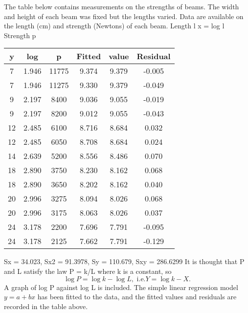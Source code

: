 \documentclass[a4paper,12pt]{article}
\begin{document}
\noindent The table below contains measurements on the strengths of beams. The width
and height of each beam was fixed but the lengths varied. Data are available
on the length (cm) and strength (Newtons) of each beam.
Length l x = log l Strength
p

\begin{center}
\begin{tabular}{c|c|c|c|c|c|}
y    &  log  &  p  &  Fitted  &  value  &  Residual\\ \hline
7  &  1.946  &  11775  &  9.374  &  9.379  &  -0.005\\ \hline
7  &  1.946  &  11275  &  9.330  &  9.379  &  -0.049\\ \hline
9  &  2.197  &  8400  &  9.036  &  9.055  &  -0.019 \\ \hline
9  &  2.197  &  8200  &  9.012  &  9.055  &  -0.043 \\ \hline
12  &  2.485  &  6100  &  8.716  &  8.684  &  0.032 \\ \hline
12  &  2.485  &  6050  &  8.708  &  8.684  &  0.024 \\ \hline
14  &  2.639  &  5200  &  8.556  &  8.486  &  0.070 \\ \hline
18  &  2.890  &  3750  &  8.230  &  8.162  &  0.068 \\ \hline
18  &  2.890  &  3650  &  8.202  &  8.162  &  0.040 \\ \hline
20  &  2.996  &  3275  &  8.094  &  8.026  &  0.068 \\ \hline
20  &  2.996  &  3175  &  8.063  &  8.026  &  0.037 \\ \hline
24  &  3.178  &  2200  &  7.696  &  7.791  &  -0.095 \\ \hline
24  &  3.178  &  2125  &  7.662  &  7.791  &  -0.129 \\ \hline
\end{tabular}
\end{center}
Sx = 34.023, Sx2 = 91.3978, Sy = 110.679, Sxy = 286.6299
It is thought that P and L satisfy the law P = k/L where k is a constant, so
\[\log P = \log k - \log L, \mbox{ i.e.} Y = \log k - X.\]
A graph of log P against log L is included.
The simple linear regression model $y = a + bx$ has been fitted to the data, and
the fitted values and residuals are recorded in the table above.
\end{document}
